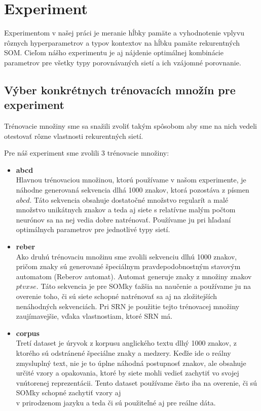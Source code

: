 \chapter{Experiment}
Experimentom v našej práci je meranie hĺbky pamäte a vyhodnotenie vplyvu rôznych
hyperparametrov a typov kontextov na hĺbku pamäte rekurentných SOM.
Cieľom nášho experimentu je aj nájdenie 
optimálnej kombinácie parametrov pre všetky typy porovnávaných sietí a ich vzájomné porovnanie.

\section{Výber konkrétnych trénovacích množín pre experiment}
Trénovacie množiny sme sa snažili zvoliť
takým spôsobom aby sme na nich vedeli otestovať rôzne vlastnosti rekurentných sietí.

Pre náš experiment sme zvolili 3 trénovacie množiny:

\begin{itemize}
    \item \textbf{abcd}\\
    Hlavnou trénovaciou množinou, ktorú používame v našom experimente, je náhodne generovaná 
    sekvencia dlhá 1000 znakov, ktorá pozostáva z písmen $abcd$.
    Táto sekvencia obsahuje dostatočné množstvo regularít a malé množstvo unikátnych znakov a teda
    aj siete s relatívne malým počtom neurónov sa na nej vedia dobre natrénovať.
    Používame ju pri hľadaní optimálnych parametrov pre jednotlivé typy sietí.
    \item \textbf{reber} \\
    Ako druhú trénovaciu množinu sme zvolili sekvenciu dlhú 1000 znakov, pričom znaky sú generované
    špeciálnym pravdepodobnostným stavovým automatom (Reberov automat). Automat generuje znaky z množiny znakov $ptvxse$.
    Táto sekvencia je pre SOMky ťažšia na naučenie a používame ju na overenie toho, či sú siete schopné natrénovať sa aj
    na zložitejších nenáhodných sekvenciách. Pri SRN je použitie tejto trénovacej množiny zaujímavejšie,
    vďaka vlastnostiam, ktoré SRN má.
    \item \textbf{corpus}\\
    Tretí dataset je úryvok z korpusu anglického textu dlhý 1000 znakov, z ktorého sú odstránené špeciálne znaky a medzery.
    Keďže ide o reálny zmysluplný text, nie je to úplne náhodná postupnosť znakov, ale obsahuje určité vzory a opakovania, ktoré by siete mohli vedieť zachytiť
    vo svojej vnútorenej reprezentácii.
    Tento dataset používame čisto iba na overenie, či 
    sú SOMky schopné zachytiť vzory aj \\ v prirodzenom jazyku a teda či sú použiteľné aj pre 
    reálne dáta.
\end{itemize}




